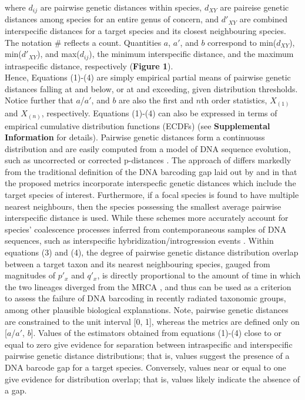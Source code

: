 \documentclass[12pt]{article}
\begin{document}
\noindent where $d_{ij}$ are pairwise genetic distances within species, $d_{XY}$ are paireise genetic distances among species for an entire genus of concern, and $d'_{XY}$ are combined interspecific distances for a target species and its closest neighbouring species. The notation \# reflects a count.  Quantities $a$, $a'$, and $b$ correspond to min($d_{XY}$), min($d'_{XY}$), and max($d_{ij}$), the minimum interspecific distance, and the maximum intraspecific distance, respectively (\textbf{Figure 1}). \\ Hence, Equations (1)-(4) are simply empirical partial means of pairwise genetic distances falling at and below, or at and exceeding, given distribution thresholds. Notice further that $a$/$a'$, and $b$ are also the first and $n$th order statistics, $X_{(1)}$ and $X_{(n)}$, respectively. Equations (1)-(4) can also be expressed in terms of empirical cumulative distribution functions (ECDFs) (see \textbf{Supplemental Information} for details). Pairwise genetic distances form a continuouss distribution and are easily computed from a model of DNA sequence evolution, such as uncorrected or corrected p-distances \citep{jukes1969evolution, kimura1980simple}. The approach of \citet{phillips2024measure} differs markedly from the traditional definition of the DNA barcoding gap laid out by \citet{meyer2005dna} and \citet{meier2008use} in that the proposed metrics incorporate interspecfic genetic distances which include the target species of interest. Furthermore, if a focal species is found to have multiple nearest neighbours, then the species possessing the smallest average pairwise interspecific distance is used. While these schemes more accurately account for species' coalescence processes inferred from contemporaneous samples of DNA sequences, such as interspecific hybridization/introgression events \citep{phillips2024measure}. Within equations (3) and (4), the degree of pairwise genetic distance distribution overlap between a target taxon and its nearest neighbouring species, gauged from magnitudes of $p'_x$ and $q'_x$, is directly proportional to the amount of time in which the two lineages diverged from the MRCA \citep{phillips2024measure}, and thus can be used as a criterion to assess the failure of DNA barcoding in recently radiated taxonomic groups, among other plausible biological explanations.  Note, pairwise genetic distances are constrained to the unit interval [0, 1], whereas the metrics are defined only on [$a$/$a'$, $b$]. Values of the estimators obtained from equations (1)-(4) close to or equal to zero give evidence for separation between intraspecific and interspecific pairwise genetic distance distributions; that is, values suggest the presence of a DNA barcode gap for a target species. Conversely, values near or equal to one give evidence for distribution overlap; that is, values likely indicate the absence of a gap. 
\end{document}
